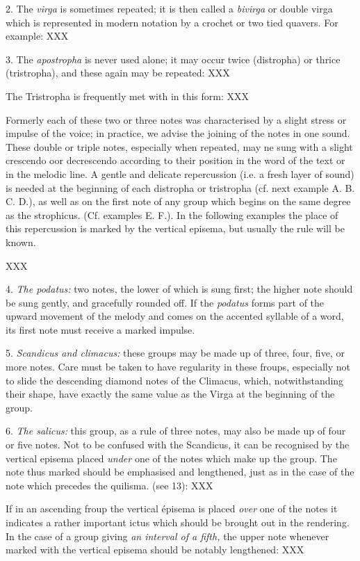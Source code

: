 2. The {\it virga} is sometimes repeated; it is then called a {\it bivirga} or double virga which is represented in modern notation by a crochet or two tied quavers. For example:
XXX

3. The {\it apostropha} is never used alone; it may occur twice (distropha) or thrice (tristropha), and these again may be repeated:
XXX

The Tristropha is frequently met with in this form:
XXX

Formerly each of these two or three notes was characterised by a slight stress or impulse of the voice; in practice, we advise the joining of the notes in one sound. These double or triple notes, especially when repeated, may ne sung with a slight crescendo oor decrescendo according to their position in the word of the text or in the melodic line. A gentle and delicate repercussion (i.e. a fresh layer of sound) is needed at the beginning of each distropha or tristropha (cf. next example A. B. C. D.), as well as on the first note of any group which begins on the same degree as the strophicus. (Cf.  examples E. F.). In the following examples the place of this repercussion is marked by the vertical episema, but usually the rule will be known.

XXX

4. {\it The podatus:} two notes, the lower of which is sung first; the higher note should be sung gently, and gracefully rounded off. If the {\it podatus} forms part of the upward movement of the melody and comes on the accented syllable of a word, its first note must receive a marked impulse.

5. {\it Scandicus and climacus:} these groups may be made up of three, four, five, or more notes. Care must be taken to have regularity in these froups, especially not to slide the descending diamond notes of the Climacus, which, notwithstanding their shape, have exactly the same value as the Virga at the beginning of the group.

6. {\it The salicus:} this group, as a rule of three notes, may also be made up of four or five notes. Not to be confused with the Scandicus, it can be recognised by the vertical episema placed {\it under} one of the notes which make up the group. The note thus marked should be emphasised and lengthened, just as in the case of the note which precedes the quilisma. (see 13):
XXX

If in an ascending froup the vertical épisema is placed {\it over} one of the notes it indicates a rather important ictus which should be brought out in the rendering. In the case of a group giving {\it an interval of a fifth,} the upper note whenever marked with the vertical episema should be notably lengthened:
XXX

